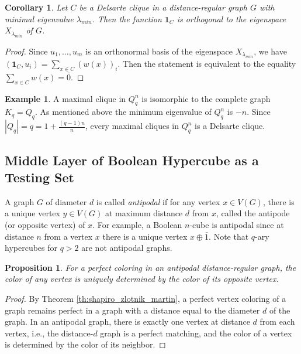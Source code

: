 \documentclass[11pt]{article}
\newtheorem{claim}{Proposition}[section]
\newtheorem{corollary}{Corollary}[section]
\theoremstyle{definition}
\newtheorem{example}{Example}[section]
\begin{document}
{{\begin{corollary}
Let $C$ be a Delsarte clique in a distance-regular graph $G$
with minimal eigenvalue $\lambda_{min}$. Then the function
${\mathbf 1}_{C}$ is orthogonal to the eigenspace
$X_{\lambda_{min}}$ of $G$.
\end{corollary}
\begin{proof}
Since $u_1,\dots,u_m$ is an orthonormal basis of the eigenspace
$X_{\lambda_{min}}$, we have
$({\mathbf 1}_{C},u_i)=\sum\limits_{x\in C} (w(x))_i$. Then the statement 
is equivalent to the equality $\sum\limits_{x\in C} w(x)=\bar 0$.
\end{proof}

\begin{example}
A maximal clique in $Q^n_q$ is isomorphic to the complete graph $K_q=Q_q$. As mentioned above the minimum eigenvalue of $Q^n_q$  is $-n$. Since $|Q_q|=q=1+\frac{(q-1)n}{n}$, every maximal cliques in  $Q^n_q$ is a Delsarte clique. 
\end{example}



\subsection{Middle Layer of Boolean Hypercube as a Testing Set}

A graph $G$ of diameter $d$ is called {\sl antipodal} if for any
vertex $x\in V(G)$, there is a unique
vertex $y\in V(G)$ at maximum distance $d$ from $x$, called the antipode  (or opposite vertex) of $x$.
For example, a Boolean $n$-cube is antipodal since at
distance $n$ from a vertex $x$ there is a unique vertex
$x\oplus \bar{1}$. Note that $q$-ary hypercubes for $q>2$ are not
antipodal graphs.

\begin{claim}\label{c:27}
For a perfect coloring in an antipodal distance-regular
graph, the color of any vertex is uniquely determined by the color
of its opposite vertex. \end{claim}
\begin{proof}
By Theorem \ref{th:shapiro_zlotnik_martin}, a perfect vertex coloring
of a graph remains perfect in a graph with a distance equal to the diameter
$d$ of the graph. In an antipodal graph, there is exactly one vertex at distance $d$ from each vertex, i.e., the  distance-$d$ graph is a perfect matching, and the color of a vertex is determined by the color of its neighbor.
\end{proof}

}}
\end{document}
